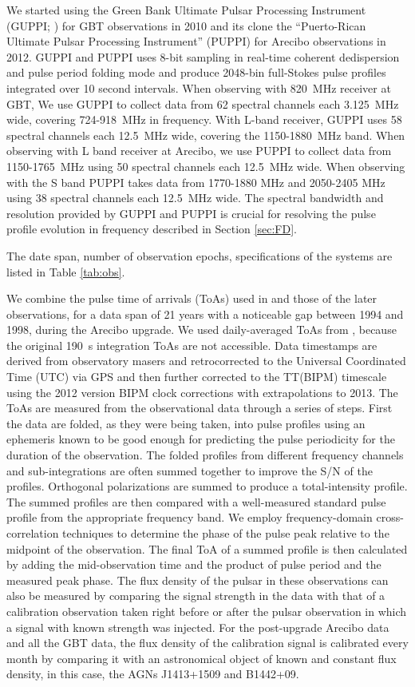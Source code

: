 We started using 
the Green Bank Ultimate Pulsar Processing Instrument (GUPPI; \citealt{GUPPI}) for GBT 
observations in 2010 and its clone the ``Puerto-Rican Ultimate Pulsar Processing Instrument''
(PUPPI) for Arecibo observations in 2012. 
GUPPI and PUPPI uses 8-bit sampling in real-time coherent dedispersion and
pulse period folding mode and produce 2048-bin full-Stokes
pulse profiles integrated over 10 second intervals.
When observing with 820~MHz receiver at GBT, We use GUPPI to collect data from 62 spectral 
channels each 3.125~MHz wide, covering 724-918~MHz in frequency. With L-band receiver, GUPPI
uses 58 spectral channels each 12.5~MHz wide, covering the 1150-1880~MHz band. 
When observing with L band receiver at Arecibo, we use PUPPI to collect data from 1150-1765~MHz
using 50 spectral channels each 12.5~MHz wide. When observing with the S band
PUPPI takes data from 1770-1880 MHz and 2050-2405 MHz using 38 spectral
channels each 12.5~MHz wide.
The spectral bandwidth and resolution provided by GUPPI and PUPPI is crucial for resolving the pulse profile evolution in frequency described in Section \ref{sec:FD}.

The date span, number of observation epochs, specifications of the
systems are listed in Table \ref{tab:obs}. 

We combine the pulse time of arrivals (ToAs) used in \citealt{sns+05} and those
of the later observations, for a data span of 21 years with a
noticeable gap between 1994 and 1998, during the Arecibo upgrade.
We used daily-averaged ToAs from \citealt{sns+05}, because the original 190~s integration ToAs are not accessible.
Data timestamps are derived from observatory masers and retrocorrected
to the Universal Coordinated Time (UTC) via GPS and then further
corrected to the TT(BIPM) timescale using the 2012 version BIPM clock corrections with extrapolations to 2013.
The ToAs are measured from the observational data through a series of
steps. First the data are folded, as they were being taken, into pulse
profiles using an ephemeris known to be good enough for predicting the
pulse periodicity for the duration of the observation. The folded
profiles from different frequency channels and sub-integrations are
often summed together to improve the S/N of the profiles.  Orthogonal
polarizations are summed to produce a total-intensity profile.
The summed profiles are then compared with a well-measured standard
pulse profile from the appropriate frequency band. We employ
frequency-domain cross-correlation techniques \citep{tay92} to determine the phase of the pulse peak relative to the midpoint of the observation. The final ToA of a summed profile is then calculated by adding the mid-observation time and the product of pulse period and the measured peak phase.
The flux density of the pulsar in these observations can also be
measured by comparing the signal strength in the data with that of a
calibration observation taken right before or after the pulsar
observation in which a signal with known strength was injected. For
the post-upgrade Arecibo data and all the GBT data, the
flux density of the calibration signal is calibrated every month by
comparing it with an astronomical object of known and constant flux
density, in this case, the AGNs J1413+1509 and B1442+09.


